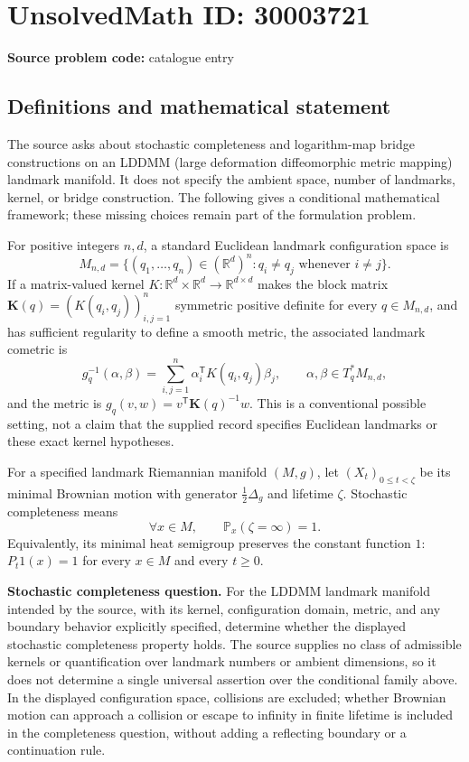 \documentclass[11pt]{article}
\newcommand{\R}{\mathbb{R}}
\begin{document}
\section*{UnsolvedMath ID: 30003721}
\textbf{Source problem code:} catalogue entry
\subsection{Definitions and mathematical statement}
The source asks about stochastic completeness and logarithm-map bridge constructions on an LDDMM (large deformation diffeomorphic metric mapping) landmark manifold. It does not specify the ambient space, number of landmarks, kernel, or bridge construction. The following gives a conditional mathematical framework; these missing choices remain part of the formulation problem.

For positive integers \(n,d\), a standard Euclidean landmark configuration space is
\[
M_{n,d}=\{(q_1,\ldots,q_n)\in(\R^d)^n:q_i\ne q_j\text{ whenever }i\ne j\}.
\]
If a matrix-valued kernel \(K:\R^d\times\R^d\to\R^{d\times d}\) makes the block matrix \(\mathbf K(q)=(K(q_i,q_j))_{i,j=1}^n\) symmetric positive definite for every \(q\in M_{n,d}\), and has sufficient regularity to define a smooth metric, the associated landmark cometric is
\[
g_q^{-1}(\alpha,\beta)=\sum_{i,j=1}^n\alpha_i^{\mathsf T}K(q_i,q_j)\beta_j,
\qquad \alpha,\beta\in T_q^*M_{n,d},
\]
and the metric is \(g_q(v,w)=v^{\mathsf T}\mathbf K(q)^{-1}w\). This is a conventional possible setting, not a claim that the supplied record specifies Euclidean landmarks or these exact kernel hypotheses.

For a specified landmark Riemannian manifold \((M,g)\), let \((X_t)_{0\le t<\zeta}\) be its minimal Brownian motion with generator \(\tfrac12\Delta_g\) and lifetime \(\zeta\). Stochastic completeness means
\[
\forall x\in M,\qquad \mathbb P_x(\zeta=\infty)=1.
\]
Equivalently, its minimal heat semigroup preserves the constant function \(1\): \(P_t1(x)=1\) for every \(x\in M\) and every \(t\ge0\).

\textbf{Stochastic completeness question.} For the LDDMM landmark manifold intended by the source, with its kernel, configuration domain, metric, and any boundary behavior explicitly specified, determine whether the displayed stochastic completeness property holds. The source supplies no class of admissible kernels or quantification over landmark numbers or ambient dimensions, so it does not determine a single universal assertion over the conditional family above. In the displayed configuration space, collisions are excluded; whether Brownian motion can approach a collision or escape to infinity in finite lifetime is included in the completeness question, without adding a reflecting boundary or a continuation rule.
\end{document}
